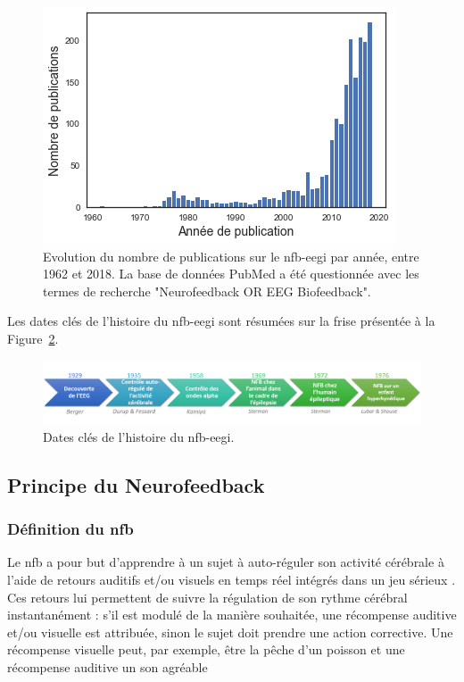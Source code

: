 \begin{figure}[h!]
  \centering
	\includegraphics[width=0.7\linewidth]{figures/chapter-1/introduction-number-of-nfb-publications} 
  \caption[Evolution du nombre de publications sur le \gls{nfb} par année, entre 1962 et 2018.]{Evolution du nombre de publications sur le \gls{nfb}-\gls{eegi} par année, entre 1962 et 2018. La base de données PubMed a été questionnée avec les 
	termes de recherche "Neurofeedback OR EEG Biofeedback".}
  \label{Figure:introduction_number_of_nfb_publications}
\end{figure}

Les dates clés de l'histoire du \gls{nfb}-\gls{eegi} sont résumées sur la frise présentée à la Figure~\ref{Figure:introduction_nfb_history}.

\begin{figure}[h!]
  \centering
	\includegraphics[width=1\linewidth]{figures/chapter-1/introduction-nfb-history} 
  \caption[Dates clés de l'histoire du \gls{nfb}.]{Dates clés de l'histoire du \gls{nfb}-\gls{eegi}.}
  \label{Figure:introduction_nfb_history}
\end{figure}

\subsection{Principe du Neurofeedback} \label{principe_nfb}

\subsubsection{Définition du \gls{nfb}}

Le \gls{nfb} a pour but d'apprendre à un sujet à auto-réguler son activité cérébrale à l'aide de retours auditifs et/ou visuels en temps réel
intégrés dans un jeu sérieux \citep{Wang2010, Marzbani2016}. Ces retours lui permettent de suivre la régulation de son rythme cérébral instantanément : s'il est modulé de 
la manière souhaitée, une récompense auditive et/ou visuelle est attribuée, sinon le sujet doit prendre une action corrective. Une récompense visuelle
peut, par exemple, être la pêche d'un poisson \citep{Bioulac2019} et une récompense auditive un son agréable \citep{Strehl2006}

